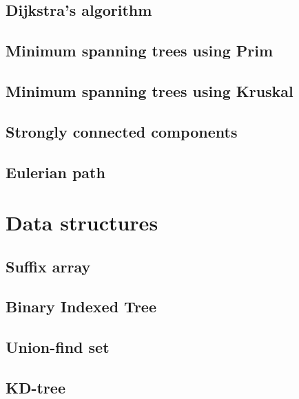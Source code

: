\subsection{Dijkstra's algorithm}
\raggedbottom
\hrulefill
\subsection{Minimum spanning trees using Prim}
\raggedbottom
\hrulefill
\subsection{Minimum spanning trees using Kruskal}
\raggedbottom
\hrulefill
\subsection{Strongly connected components}
\raggedbottom
\hrulefill
\subsection{Eulerian path}
\raggedbottom
\hrulefill

\section{Data structures}
\subsection{Suffix array}
\raggedbottom
\hrulefill
\subsection{Binary Indexed Tree}
\raggedbottom
\hrulefill
\subsection{Union-find set}
\raggedbottom
\hrulefill
\subsection{KD-tree}
\raggedbottom
\hrulefill
